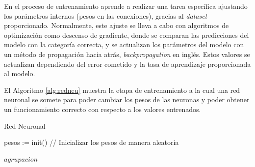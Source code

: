 		
		En el proceso de entrenamiento aprende a realizar una tarea específica ajustando los parámetros internos (pesos en las conexiones), gracias al \textit{dataset} proporcionado. Normalmente, este ajuste se lleva a cabo con algoritmos de optimización como descenso de gradiente, donde se comparan las predicciones del modelo con la categoría correcta, y se actualizan los parámetros del modelo con un método de propagación hacia atrás, \textit{backpropagation} en inglés. Estos valores se actualizan dependiendo del error cometido y la tasa de aprendizaje proporcionada al modelo.
		
		El Algoritmo \ref{alg:redneu} muestra la etapa de entrenamiento a la cual una red neuronal se somete para poder cambiar los pesos de las neuronas y poder obtener un funcionamiento correcto con respecto a los valores entrenados.



		\begin{algorithm}
			\caption{Red Neuronal}
			\label{alg:redneu}
			pesos := init() // Inicializar los pesos de manera aleatoria\\
			
			
			\Return $agrupacion$
		\end{algorithm}

